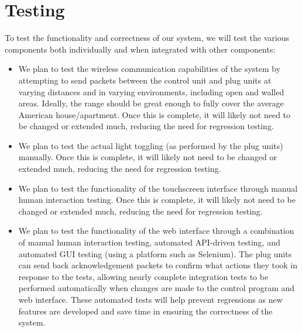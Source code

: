 \documentclass[oneside,openright]{book}
\begin{document}
\section{Testing}

To test the functionality and correctness of our system, we will test the
various components both individually and when integrated with other components:

\begin{itemize}
    \item We plan to test the wireless communication capabilities of the system
        by attempting to send packets between the control unit and plug units
        at varying distances and in varying environments, including open and
        walled areas.  Ideally, the range should be great enough to fully cover
        the average American house/apartment.  Once this is complete, it will
        likely not need to be changed or extended much, reducing the need for
        regression testing.
    \item We plan to test the actual light toggling (as performed by the plug
        units) manually.  Once this is complete, it will likely not need to be
        changed or extended much, reducing the need for regression testing.
    \item We plan to test the functionality of the touchscreen interface
        through manual human interaction testing.  Once this is complete, it
        will likely not need to be changed or extended much, reducing the need
        for regression testing.
    \item We plan to test the functionality of the web interface through a
        combination of manual human interaction testing, automated API-driven
        testing, and automated GUI testing (using a platform such as Selenium).
        The plug units can send back acknowledgement packets to confirm what
        actions they took in response to the tests, allowing nearly complete
        integration tests to be performed automatically when changes are made
        to the control program and web interface.  These automated tests will
        help prevent regressions as new features are developed and save time in
        ensuring the correctness of the system.
\end{itemize}
\end{document}
